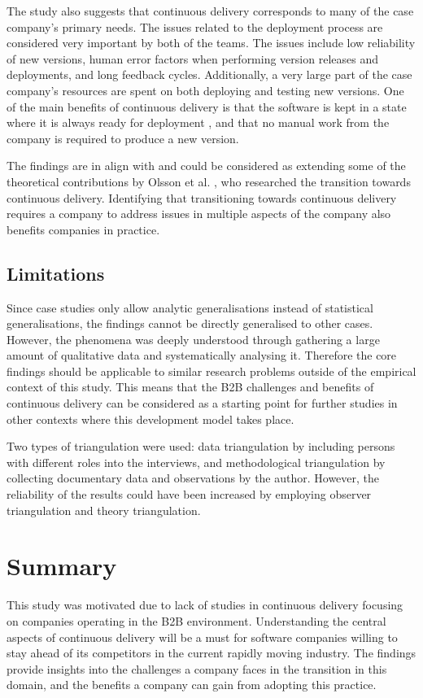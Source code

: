 \documentclass[lnbip]{svmultln}
\begin{document}
The study also suggests that continuous delivery corresponds to many of the case company's primary needs. The issues related to the deployment process are considered very important by both of the teams. The issues include low reliability of new versions, human error factors when performing version releases and deployments, and long feedback cycles. Additionally, a very large part of the case company's resources are spent on both deploying and testing new versions. One of the main benefits of continuous delivery is that the software is kept in a state where it is always ready for deployment \cite{cdbook}, and that no manual work from the company is required to produce a new version. 

The findings are in align with and could be considered as extending some of the theoretical contributions by Olsson et al. \cite{olsson2012climbing}, who researched the transition towards continuous delivery. Identifying that transitioning towards continuous delivery requires a company to address issues in multiple aspects of the company also benefits companies in practice.   

\subsection{Limitations}
Since case studies only allow analytic generalisations instead of statistical generalisations, the findings cannot be directly generalised to other cases. However, the phenomena was deeply understood through gathering a large amount of qualitative data and systematically analysing it. Therefore the core findings should be applicable to similar research problems outside of the empirical context of this study. This means that the B2B challenges and benefits of continuous delivery can be considered as a starting point for further studies in other contexts where this development model takes place.

Two types of triangulation were used: data triangulation by including persons with different roles into the interviews, and methodological triangulation by collecting documentary data and observations by the author. However, the reliability of the results could have been increased by employing observer triangulation and theory triangulation. 

\section{Summary}
This study was motivated due to lack of studies in continuous delivery focusing on companies operating in the B2B environment. Understanding the central aspects of continuous delivery will be a must for software companies willing to stay ahead of its competitors in the current rapidly moving industry. The findings provide insights into the challenges a company faces in the transition in this domain, and the benefits a company can gain from adopting this practice.
\end{document}
